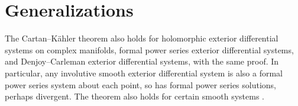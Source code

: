 \section{Generalizations}
The Cartan--K\"ahler theorem also holds for holomorphic exterior differential systems on complex manifolds, formal power series exterior differential systems, and Denjoy--Carleman exterior differential systems, with the same proof.
In particular, any involutive smooth exterior differential system is also a formal power series system about each point, so has formal power series solutions,  perhaps divergent.
The theorem also holds for certain smooth systems \cite{Kakie:1989,Kakie:2008,Yang:1987}.